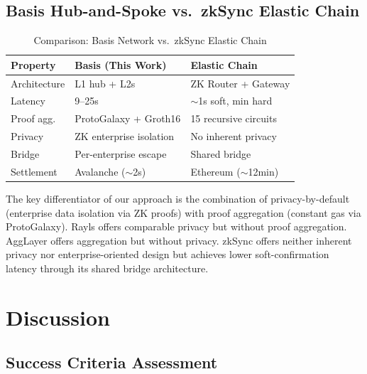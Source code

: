 \documentclass[conference]{IEEEtran}
\begin{document}
\subsection{Basis Hub-and-Spoke vs.\ zkSync Elastic Chain}

\begin{table}[t]
  \centering
  \caption{Comparison: Basis Network vs.\ zkSync Elastic Chain}
  \label{tab:vs_zksync}
  \begin{tabular}{@{}L{2.2cm}L{2.4cm}L{2.4cm}@{}}
    \toprule
    \textbf{Property} & \textbf{Basis (This Work)} & \textbf{Elastic Chain} \\
    \midrule
    Architecture & L1 hub + L2s & ZK Router + Gateway \\
    Latency & 9--25s & $\sim$1s soft, min hard \\
    Proof agg. & ProtoGalaxy + Groth16 & 15 recursive circuits \\
    Privacy & ZK enterprise isolation & No inherent privacy \\
    Bridge & Per-enterprise escape & Shared bridge \\
    Settlement & Avalanche ($\sim$2s) & Ethereum ($\sim$12min) \\
    \bottomrule
  \end{tabular}
\end{table}

The key differentiator of our approach is the combination of privacy-by-default
(enterprise data isolation via ZK proofs) with proof aggregation (constant gas
via ProtoGalaxy). Rayls offers comparable privacy but without proof aggregation.
AggLayer offers aggregation but without privacy. zkSync offers neither inherent
privacy nor enterprise-oriented design but achieves lower soft-confirmation
latency through its shared bridge architecture.


\section{Discussion}
\label{sec:discussion}

\subsection{Success Criteria Assessment}
\end{document}
